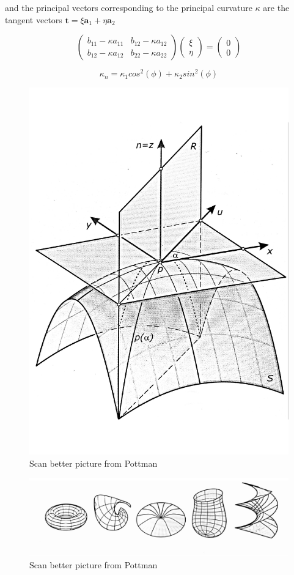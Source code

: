 and the principal vectors corresponding to the principal curvature $\kappa$ are the tangent vectors $\textbf{t} = \xi \textbf{a}_1 + \eta \textbf{a}_2$

\begin{equation}
\begin{pmatrix} 
b_{11} - \kappa a_{11} & b_{12} - \kappa a_{12} \\ 
b_{12} - \kappa a_{12} & b_{22} - \kappa a_{22}
\end{pmatrix}
\begin{pmatrix}
\xi \\
\eta
\end{pmatrix}
=
\begin{pmatrix}
0 \\
0
\end{pmatrix}
\end{equation}


\begin{equation}
\kappa_n = \kappa_1cos^2(\phi) + \kappa_2sin^2(\phi) 
\end{equation}

\begin{figure}[H]
\centering
\includegraphics[width = 0.6\linewidth ]{figure/Theory/principalCurvature2.pdf}
\caption{Scan better picture from Pottman }
\end{figure}



\begin{figure}[H]
\centering
\includegraphics[width = 0.9\linewidth ]{figure/Theory/principalCurvature.pdf}
\caption{Scan better picture from Pottman }
\end{figure}


